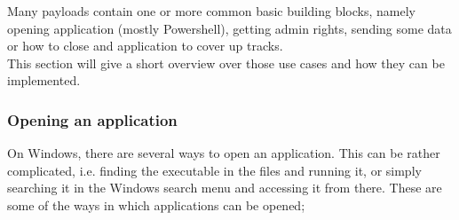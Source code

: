 Many payloads contain one or more common basic building blocks, namely opening application (mostly Powershell), getting admin rights, sending some data or how to close and application to cover up tracks.  \\
This section will give a short overview over those use cases and how they can be implemented.


\subsubsection{Opening an application}

On Windows, there are several ways to open an application. This can be rather complicated, i.e. finding the executable in the files and running it, or simply searching it in the Windows search menu and accessing it from there. These are some of the ways in which applications can be opened;
